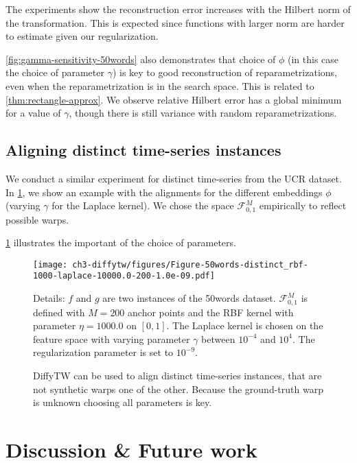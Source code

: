 The experiments show the reconstruction error increases with the Hilbert norm of the transformation. This is expected since functions with larger norm are harder to estimate given our regularization.

\cref{fig:gamma-sensitivity-50words} also demonstrates that choice of $\phi$ (in this case the choice of parameter $\gamma$) is key to good reconstruction of reparametrizations, even when the reparametrization is in the search space. This is related to \cref{thm:rectangle-approx}. We observe relative Hilbert error has a global minimum for a value of $\gamma$, though there is still variance with random reparametrizations.

\subsection{Aligning distinct time-series instances}
We conduct a similar experiment for distinct time-series from the UCR dataset. In \cref{fig:gamma-sensitivity-50words-distinct}, we show an example with the alignments for the different embeddings $\phi$ (varying $\gamma$ for the Laplace kernel). We chose the space $\mathcal F_{0,1}^M$ empirically to reflect possible warps.

\cref{fig:gamma-sensitivity-50words-distinct} illustrates the important of the choice of parameters.




\begin{figure}[ht!]
\begin{center}
\texttt{[image: ch3-diffytw/figures/Figure-50words-distinct\_rbf-1000-laplace-10000.0-200-1.0e-09.pdf]}
\end{center}
\caption[Aligning time-series instances.]{DiffyTW can be used to align distinct time-series instances, that are not synthetic warps one of the other. Because the ground-truth warp is unknown choosing all parameters is key.}
\small Details: $f$ and $g$ are two instances of the 50words dataset.
$\mathcal F_{0,1}^M$ is defined with $M=200$ anchor points and the RBF kernel with parameter $\eta=1000.0$ on $[0,1]$.
The Laplace kernel is chosen on the feature space with varying parameter $\gamma$ between $10^{-4}$ and $10^{4}$.
The regularization parameter is set to $10^{-9}$.
\label{fig:gamma-sensitivity-50words-distinct}
\end{figure}


\section{Discussion \& Future work}

